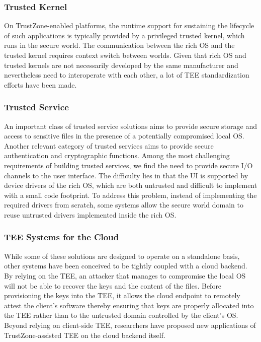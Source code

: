 \documentclass{article}
\begin{document}
\subsubsection{Trusted Kernel}

On TrustZone-enabled platforms, the runtime support for sustaining the lifecycle of such applications is typically provided by a privileged trusted kernel, which runs in the secure world. The communication between the rich OS and the trusted kernel requires context switch between worlds. Given that rich OS and trusted kernels are not necessarily developed by the same manufacturer and nevertheless need to interoperate with each other, a lot of TEE standardization efforts have been made.

\subsubsection{Trusted Service}

An important class of trusted service solutions aims to provide secure storage and access to sensitive files in the presence of a potentially compromised local OS. Another relevant category of trusted services aims to provide secure authentication and cryptographic functions. Among the most challenging requirements of building trusted services, we find the need to provide secure I/O channels to the user interface. The difficulty lies in that the UI is supported by device drivers of the rich OS, which are both untrusted and difficult to implement with a small code footprint. To address this problem, instead of implementing the required drivers from scratch, some systems allow the secure world domain to reuse untrusted drivers implemented inside the rich OS.

\subsubsection{TEE Systems for the Cloud}

While some of these solutions are designed to operate on a standalone basis, other systems have been conceived to be tightly coupled with a cloud backend. By relying on the TEE, an attacker that manages to compromise the local OS will not be able to recover the keys and the content of the files. Before provisioning the keys into the TEE, it allows the cloud endpoint to remotely attest the client’s software thereby ensuring that keys are properly allocated into the TEE rather than to the untrusted domain controlled by the client’s OS. Beyond relying on client-side TEE, researchers have proposed new applications of TrustZone-assisted TEE on the cloud backend itself.
\end{document}
